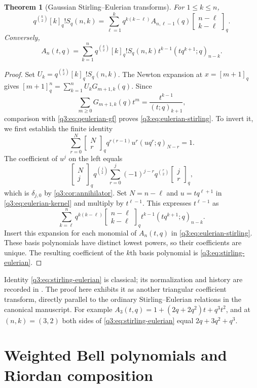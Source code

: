 \documentclass[11pt,a4paper,oneside,openany]{book}
\newtheorem{theorem}{Theorem}[chapter]
\theoremstyle{definition}
\theoremstyle{remark}
\newcommand{\GB}[3][q]{\begin{bmatrix}#2\\#3\end{bmatrix}_{#1}}
\newcommand{\G}[2]{\GB{#1}{#2}}
\newcommand{\qfac}[1]{[#1]_q!}
\begin{document}
\begin{theorem}[Gaussian Stirling--Eulerian transforms]
\label{q3:thm:stirling-eulerian}
For $1\le k\le n$,
\begin{equation}
 q^{\binom k2}\qfac k S_q(n,k)
 =\sum_{\ell=1}^k q^{k(k-\ell)}A_{n,\ell-1}(q)
       \G{n-\ell}{k-\ell}.
 \label{q3:eq:stirling-eulerian}
\end{equation}
Conversely,
\begin{equation}
 A_n(t,q)=\sum_{k=1}^n
 q^{\binom k2}\qfac kS_q(n,k)
       t^{k-1}(tq^{k+1};q)_{n-k}.
 \label{q3:eq:eulerian-stirling}
\end{equation}
\end{theorem}
\begin{proof}
Set $U_k=q^{\binom k2}\qfac kS_q(n,k)$. The Newton expansion at
$x=[m+1]_q$ gives
$[m+1]_q^n=\sum_{k=1}^nU_kG_{m+1,k}(q)$.
Since
\[
 \sum_{m\ge0}G_{m+1,k}(q)t^m=\frac{t^{k-1}}{(t;q)_{k+1}},
\]
comparison with \cref{q3:eq:qeulerian-gf} proves
\cref{q3:eq:eulerian-stirling}.
To invert it, we first establish the finite identity
\begin{equation}
 \sum_{r=0}^N\G Nr q^{r(r-1)}u^r(uq^r;q)_{N-r}=1.
 \label{q3:eq:eulerian-kernel}
\end{equation}
The coefficient of $u^j$ on the left equals
\[
 \G Nj q^{\binom j2}
   \sum_{r=0}^j(-1)^{j-r}q^{\binom r2}\G jr,
\]
which is $\delta_{j,0}$ by \cref{q3:cor:annihilator}. Set
$N=n-\ell$ and $u=tq^{\ell+1}$ in \cref{q3:eq:eulerian-kernel} and
multiply by $t^{\ell-1}$. This expresses $t^{\ell-1}$ as
\[
 \sum_{k=\ell}^n q^{k(k-\ell)}\G{n-\ell}{k-\ell}
          t^{k-1}(tq^{k+1};q)_{n-k}.
\]
Insert this expansion for each monomial of $A_n(t,q)$ in
\cref{q3:eq:eulerian-stirling}. These basis polynomials have distinct
lowest powers, so their coefficients are unique. The resulting
coefficient of the $k$th basis polynomial is \cref{q3:eq:stirling-eulerian}.
\end{proof}
Identity \cref{q3:eq:stirling-eulerian} is classical; its normalization and
history are recorded in \cite{dingzeng}. The proof here exhibits it as
another triangular coefficient transform, directly parallel to the
ordinary Stirling--Eulerian relations in the canonical manuscript.
For example $A_3(t,q)=1+(2q+2q^2)t+q^3t^2$, and at $(n,k)=(3,2)$
both sides of \cref{q3:eq:stirling-eulerian} equal
$2q+3q^2+q^3$.

\chapter{Weighted Bell polynomials and Riordan composition}
\label{q1:qcc:composition}
\end{document}
